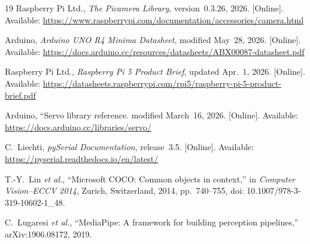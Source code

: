 \documentclass[lettersize,journal]{IEEEtran}
\begin{document}
\begin{thebibliography}{19}
Raspberry Pi Ltd., \emph{The Picamera Library}, version~0.3.26, 2026. [Online]. Available: \url{https://www.raspberrypi.com/documentation/accessories/camera.html}

Arduino, \emph{Arduino UNO R4 Minima Datasheet}, modified May~28, 2026. [Online]. Available: \url{https://docs.arduino.cc/resources/datasheets/ABX00087-datasheet.pdf}

Raspberry Pi Ltd., \emph{Raspberry Pi 5 Product Brief}, updated Apr.~1, 2026. [Online]. Available: \url{https://datasheets.raspberrypi.com/rpi5/raspberry-pi-5-product-brief.pdf}

Arduino, ``Servo library reference. modified March~16, 2026. [Online]. Available: \url{https://docs.arduino.cc/libraries/servo/}

C.~Liechti, \emph{pySerial Documentation}, release~3.5. [Online]. Available: \url{https://pyserial.readthedocs.io/en/latest/}

T.-Y.~Lin \emph{et al.}, ``Microsoft COCO: Common objects in context,'' in \emph{Computer Vision--ECCV 2014}, Zurich, Switzerland, 2014, pp.~740--755, doi: 10.1007/978-3-319-10602-1\_48.

C.~Lugaresi \emph{et al.}, ``MediaPipe: A framework for building perception pipelines,'' arXiv:1906.08172, 2019.

\end{thebibliography}
\end{document}
